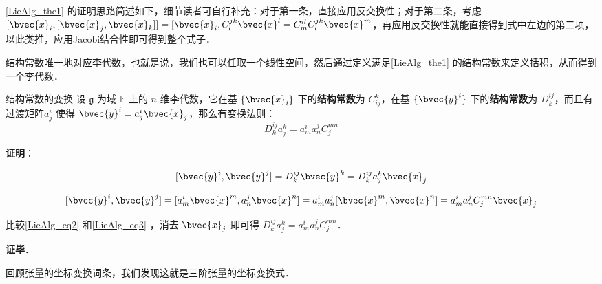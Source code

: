 \autoref{LieAlg_the1} 的证明思路简述如下，细节读者可自行补充：对于第一条，直接应用反交换性；对于第二条，考虑 $[\bvec{x}_i, [\bvec{x}_j, \bvec{x}_k]]=[\bvec{x}_i, C^{jk}_l \bvec{x}^l=C^{il}_mC^{jk}_l \bvec{x}^m$，再应用反交换性就能直接得到式中左边的第二项，以此类推，应用Jacobi结合性即可得到整个式子．

结构常数唯一地对应李代数，也就是说，我们也可以任取一个线性空间，然后通过定义满足\autoref{LieAlg_the1} 的结构常数来定义括积，从而得到一个李代数．

\begin{theorem}{结构常数的变换}
设 $\mathfrak{g}$ 为域 $\mathbb{F}$ 上的 $n$ 维李代数，它在基 $\{\bvec{x}_i\}$ 下的\textbf{结构常数}为 $C^k_{ij}$，在基 $\{\bvec{y}^i\}$ 下的\textbf{结构常数}为 $D_k^{ij}$，而且有过渡矩阵$a^i_j$ 使得 $\bvec{y}^i=a^i_j\bvec{x}_j$，那么有变换法则：
\begin{equation}
D^{ij}_ka^k_j=a^i_ma^j_nC_j^{mn}
\end{equation}

\end{theorem}

\textbf{证明}：

\begin{equation}\label{LieAlg_eq2}
[\bvec{y}^i, \bvec{y}^j]=D^{ij}_k\bvec{y}^k=D^{ij}_ka^k_j\bvec{x}_j
\end{equation}

\begin{equation}\label{LieAlg_eq3}
[\bvec{y}^i, \bvec{y}^j]=[a^i_m\bvec{x}^m, a^j_n\bvec{x}^n]=a^i_ma^j_n[\bvec{x}^m, \bvec{x}^n]=a^i_ma^j_nC_j^{mn}\bvec{x}_j
\end{equation}

比较\autoref{LieAlg_eq2} 和\autoref{LieAlg_eq3} ，消去 $\bvec{x}_j$ 即可得 $D^{ij}_ka^k_j=a^i_ma^j_nC_j^{mn}$．

\textbf{证毕}．

回顾张量的坐标变换词条，我们发现这就是三阶张量的坐标变换式．






